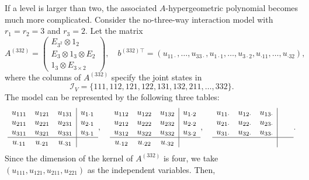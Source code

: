 \documentclass[a4paper,12pt]{article}
\theoremstyle{plain}
\theoremstyle{remark}
\begin{document}
If a level is larger than two, the associated $A$-hypergeometric
polynomial becomes much more complicated. Consider the
no-three-way interaction model with $r_1=r_2=3$ and $r_3=2$. Let
the matrix
\[
  A^{(332)}=\left(
  \begin{array}{c}
    E_{3^2}\otimes 1_2\\
    E_3\otimes 1_3\otimes E_2\\
    1_3\otimes E_{3\times2}
  \end{array}\right), \quad
  b^{(332)\top}=(
  u_{11\cdot},\ldots,u_{33\cdot},u_{1\cdot1},\ldots,u_{3\cdot2},
  u_{\cdot11},\ldots,u_{\cdot32}),
\]
where the columns of $A^{(332)}$ specify the joint states in
\[
\mathcal{I}_V=\{111, 112, 121, 122, 131, 132, 211, \ldots, 332\}.
\]
The model can be represented by the following three tables:
\begin{equation*}
  \begin{array}{ccc|c}
  u_{111}    &u_{121}    &u_{131}    &u_{1\cdot1}\\
  u_{211}    &u_{221}    &u_{231}    &u_{2\cdot1}\\
  u_{311}    &u_{321}    &u_{331}    &u_{3\cdot1}\\
  \hline
  u_{\cdot11}&u_{\cdot21}&u_{\cdot31}&\\
  \end{array},\quad
  \begin{array}{ccc|c}
  u_{112}    &u_{122}    &u_{132}    &u_{1\cdot2}\\
  u_{212}    &u_{222}    &u_{232}    &u_{2\cdot2}\\
  u_{312}    &u_{322}    &u_{332}    &u_{3\cdot2}\\
  \hline
  u_{\cdot12}&u_{\cdot22}&u_{\cdot32}&\\
  \end{array},\quad
  \begin{array}{ccc|c}
  u_{11\cdot}    &u_{12\cdot}    &u_{13\cdot}    &~~~\\
  u_{21\cdot}    &u_{22\cdot}    &u_{23\cdot}    &~~~\\
  u_{31\cdot}    &u_{32\cdot}    &u_{33\cdot}    &~~~\\
  \hline
  &&&\\
  \end{array}.
\end{equation*}
Since the dimension of the kernel of $A^{(332)}$ is four, we take
$(u_{111},u_{121},u_{211},u_{221})$ as the independent variables.
Then,
\end{document}
